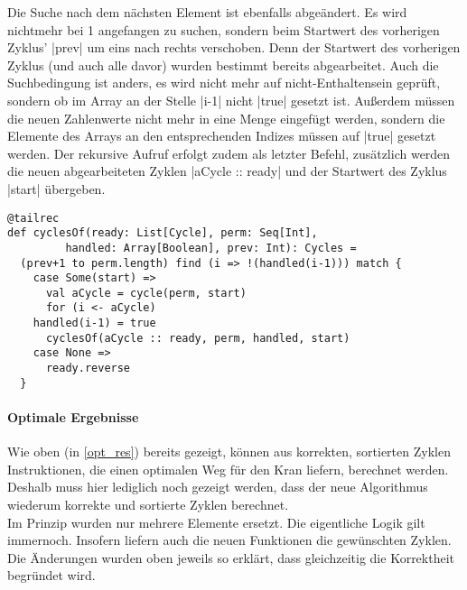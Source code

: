 Die Suche nach dem nächsten Element ist ebenfalls abgeändert.
Es wird nichtmehr bei 1 angefangen zu suchen, sondern beim Startwert des vorherigen Zyklus' |prev| um eins nach rechts verschoben.
Denn der Startwert des vorherigen Zyklus (und auch alle davor) wurden bestimmt bereits abgearbeitet.
Auch die Suchbedingung ist anders, es wird nicht mehr auf nicht-Enthaltensein geprüft, sondern ob im Array an der Stelle |i-1| nicht |true| gesetzt ist.
Außerdem müssen die neuen Zahlenwerte nicht mehr in eine Menge eingefügt werden, sondern die Elemente des Arrays an den entsprechenden Indizes müssen auf |true| gesetzt werden.
Der rekursive Aufruf erfolgt zudem als letzter Befehl,
zusätzlich werden die neuen abgearbeiteten Zyklen |aCycle :: ready| und der Startwert des Zyklus |start| übergeben.
\begin{lstlisting}
@tailrec
def cyclesOf(ready: List[Cycle], perm: Seq[Int],
	     handled: Array[Boolean], prev: Int): Cycles =
  (prev+1 to perm.length) find (i => !(handled(i-1))) match {
    case Some(start) =>
      val aCycle = cycle(perm, start)
      for (i <- aCycle)
	handled(i-1) = true
      cyclesOf(aCycle :: ready, perm, handled, start)
    case None =>
      ready.reverse
  }
\end{lstlisting}

\paragraph{Optimale Ergebnisse}
Wie oben (in \ref{opt_res}) bereits gezeigt, können aus korrekten, sortierten Zyklen Instruktionen, die einen optimalen Weg für den Kran liefern, berechnet werden.
Deshalb muss hier lediglich noch gezeigt werden, dass der neue Algorithmus wiederum korrekte und sortierte Zyklen berechnet. \\
Im Prinzip wurden nur mehrere Elemente ersetzt. Die eigentliche Logik gilt immernoch. Insofern liefern auch die neuen Funktionen die gewünschten Zyklen.
Die Änderungen wurden oben jeweils so erklärt, dass gleichzeitig die Korrektheit begründet wird.

